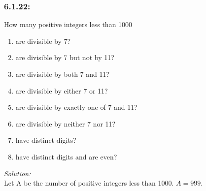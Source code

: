 \documentclass[a4paper]{article}
\begin{document}
\subsubsection*{6.1.22:} How many positive integers less than 1000
\begin{enumerate}[label = \textbf{\alph*)}]
	\item are divisible by 7?
	\item are divisible by 7 but not by 11?
	\item are divisible by both 7 and 11?
	\item are divisible by either 7 or 11?
	\item are divisible by exactly one of 7 and 11?
	\item are divisible by neither 7 nor 11?
	\item have distinct digits?
	\item have distinct digits and are even?
\end{enumerate}
\textit{Solution:} \\
Let A be the number of positive integers less than 1000. $A = 999$.
\end{document}
